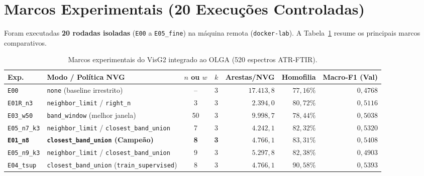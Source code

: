 \documentclass[11pt,a4paper]{article}
\begin{document}
\section{Marcos Experimentais (20 Execuções Controladas)}
Foram executadas \textbf{20 rodadas isoladas} (\texttt{E00} a \texttt{E05\_fine}) na máquina remota (\texttt{docker-lab}). A Tabela~\ref{tab:marcos} resume os principais marcos comparativos.

\begin{table}[ht]
\centering
\caption{Marcos experimentais do VisG2 integrado ao OLGA (520 espectros ATR-FTIR).}
\label{tab:marcos}
\small
\begin{tabular}{@{}l l c c r r r@{}}
\toprule
\textbf{Exp.} & \textbf{Modo / Política NVG} & \textbf{$n$ ou $w$} & \textbf{$k$} & \textbf{Arestas/NVG} & \textbf{Homofilia} & \textbf{Macro-F1 (Val)} \\
\midrule
\texttt{E00} & \texttt{none} (baseline irrestrito) & -- & 3 & $17.413{,}8$ & $77{,}16\%$ & $0{,}4768$ \\
\texttt{E01R\_n3} & \texttt{neighbor\_limit} / \texttt{right\_n} & 3 & 3 & $2.394{,}0$ & $80{,}72\%$ & $0{,}5116$ \\
\texttt{E03\_w50} & \texttt{band\_window} (melhor janela) & 50 & 3 & $9.998{,}7$ & $78{,}44\%$ & $0{,}5038$ \\
\texttt{E05\_n7\_k3} & \texttt{neighbor\_limit} / \texttt{closest\_band\_union} & 7 & 3 & $4.242{,}1$ & $82{,}32\%$ & $0{,}5320$ \\
\rowcolor{bestrow}
\textbf{\texttt{E01\_n8}} & \textbf{\texttt{closest\_band\_union} (Campeão)} & \textbf{8} & \textbf{3} & \textbf{$4.766{,}1$} & \textbf{$83{,}31\%$} & \textbf{$0{,}5408$} \\
\texttt{E05\_n9\_k3} & \texttt{neighbor\_limit} / \texttt{closest\_band\_union} & 9 & 3 & $5.297{,}8$ & $82{,}38\%$ & $0{,}4903$ \\
\texttt{E04\_tsup} & \texttt{closest\_band\_union} (\texttt{train\_supervised}) & 8 & 3 & $4.766{,}1$ & $90{,}58\%$ & $0{,}5393$ \\
\bottomrule
\end{tabular}
\end{table}
\end{document}
